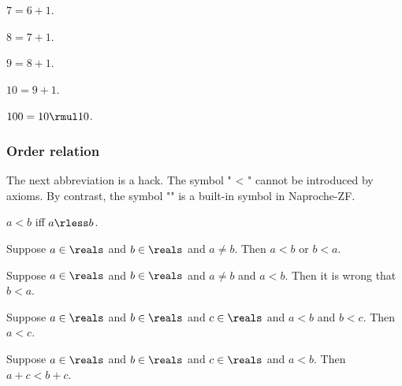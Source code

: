 \begin{axiom} \label{def_of_7}
    $7 = 6 + 1$.
\end{axiom}    

\begin{axiom} \label{def_of_8}
    $8 = 7 + 1$.
\end{axiom}    

\begin{axiom} \label{def_of_9}
    $9 = 8 + 1$.
\end{axiom}    

\begin{axiom} \label{def_of_10}
    $10 = 9 + 1$.
\end{axiom}    

\begin{axiom} \label{def_of_100}
    $100 = 10 \rmul 10$.
\end{axiom}    

\subsubsection{Order relation}

The next abbreviation is a hack. The symbol " < " cannot be introduced by axioms.
By contrast, the symbol "\rless" is a built-in symbol in Naproche-ZF. 

\begin{abbreviation}\label{real_lt}
    $a < b$ iff $a \rless b$.
\end{abbreviation}


\begin{axiom}\label{real_lt_trichotomy}
    Suppose $a\in\reals$ and $b\in\reals$ and $a\neq b$.
    Then $a < b$ or $b < a$.
\end{axiom}

\begin{axiom}\label{real_lt_asym}
    Suppose $a\in\reals$ and $b\in\reals$ and $a\neq b$ and $a < b$.
    Then it is wrong that $b < a$.
\end{axiom}

\begin{axiom}\label{real_lt_trans}
    Suppose $a\in\reals$ and $b\in\reals$ and $c\in\reals$ and $a < b$ and $b < c$.
    Then $a < c$.
\end{axiom}

\begin{axiom}\label{real_lt_add}
    Suppose $a\in\reals$ and $b\in\reals$ and $c\in\reals$ and $a < b$.
    Then $a + c < b + c$.
\end{axiom}

